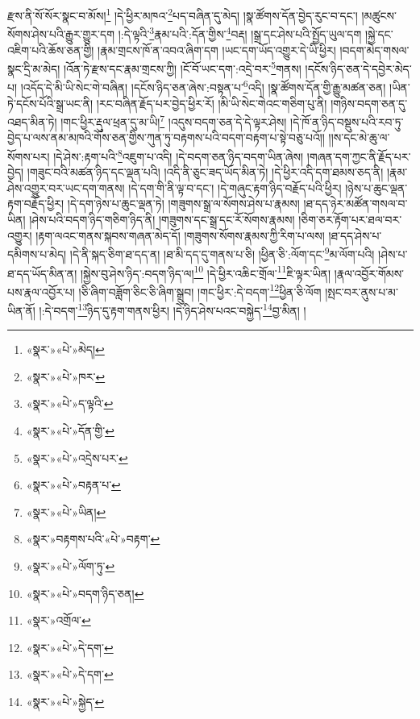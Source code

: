 རྫས་ནི་སོ་སོར་སྣང་བ་མོས།\footnote{«སྣར་»«པེ་»མེད།} །དེ་ཕྱིར་མཁའ་\footnote{«སྣར་»«པེ་»ཁར་}པད་བཞིན་དུ་མེད། །སྣ་ཚོགས་དོན་བྱེད་རུང་བ་དང་། །མཚུངས་སོགས་ཤེས་པའི་རྒྱུར་གྱུར་དག །:དེ་ལྟའི་\footnote{«སྣར་»«པེ་»ད་ལྟའི་}རྣམ་པའི་:དོན་གྱིས་\footnote{«སྣར་»«པེ་»དོན་གྱི་}བརྡ། །སྒྲ་དང་ཤེས་པའི་སྤྱོད་ཡུལ་དག །སྐྱེ་དང་འཇིག་པའི་ཆོས་ཅན་གྱི། །རྣམ་གྲངས་ཁོ་ན་འབའ་ཞིག་དག །ཡང་དག་ཡོད་འགྱུར་དེ་ཡི་ཕྱིར། །བདག་མེད་གསལ་སྣང་དྲི་མ་མེད། །འོན་ཏེ་རྫས་དང་རྣམ་གྲངས་ཀྱི། །ངོ་བོ་ཡང་དག་:འདྲེ་བར་\footnote{«སྣར་»«པེ་»འདྲེས་པར་}གནས། །དངོས་ཉིད་ཅན་དེ་དབྱེར་མེད་པ། །འདོད་དེ་མི་ཡི་སེང་གེ་བཞིན། །དངོས་ཉིད་ཅན་ཞེས་:བསྟན་པ་\footnote{«སྣར་»«པེ་»བརྟན་པ་}འདི། །སྣ་ཚོགས་དོན་གྱི་རྒྱུ་མཚན་ཅན། །ཡིན་ཏེ་དངོས་པོའི་སྒྲ་ཡང་ནི། །རང་བཞིན་རྗོད་པར་བྱེད་ཕྱིར་རོ། །མི་ཡི་སེང་གེའང་གཅིག་པུ་ནི། །གཉིས་བདག་ཅན་དུ་འཐད་མིན་ཏེ། །གང་ཕྱིར་རྡུལ་ཕྲན་དུ་མ་ཡི།\footnote{«སྣར་»«པེ་»ཡིན།} །འདུས་བདག་ཅན་དེ་དེ་ལྟར་ཤེས། །དེ་ཁོ་ན་ཉིད་བསྡུས་པའི་རབ་ཏུ་བྱེད་པ་ལས་ནམ་མཁའི་གོས་ཅན་གྱིས་ཀུན་ཏུ་བརྟགས་པའི་བདག་བརྟག་པ་སྟེ་བཅུ་པའོ།། །།ས་དང་མེ་ཆུ་ལ་སོགས་པར། །དེ་ཤེས་:རྟག་པའི་\footnote{«སྣར་»བརྟགས་པའི་«པེ་»བརྟག་}འཇུག་པ་འདི། །དེ་བདག་ཅན་ཉིད་བདག་ཡིན་ཞེས། །གཞན་དག་ཀྱང་ནི་རྗོད་པར་བྱེད། །གཟུང་བའི་མཚན་ཉིད་དང་ལྡན་པའི། །འདི་ནི་ཅུང་ཟད་ཡོད་མིན་ཏེ། །དེ་ཕྱིར་འདི་དག་ཐམས་ཅད་ནི། །རྣམ་ཤེས་འགྱུར་བར་ཡང་དག་གནས། །དེ་དག་གི་ནི་ལྟ་བ་དང་། །དེ་གཞུང་རྟག་ཉིད་བརྗོད་པའི་ཕྱིར། །ཉེས་པ་ཆུང་ལྡན་རྟག་བརྗོད་ཕྱིར། །དེ་དག་ཉེས་པ་ཆུང་ལྡན་ཏེ། །གཟུགས་སྒྲ་ལ་སོགས་ཤེས་པ་རྣམས། །ཐ་དད་ཉེར་མཚོན་གསལ་བ་ཡིན། །ཤེས་པའི་བདག་ཉིད་གཅིག་ཉིད་ནི། །གཟུགས་དང་སྒྲ་དང་རོ་སོགས་རྣམས། །ཅིག་ཅར་རྟོག་པར་ཐལ་བར་འགྱུར། །རྟག་ལའང་གནས་སྐབས་གཞན་མེད་དོ། །གཟུགས་སོགས་རྣམས་ཀྱི་རིག་པ་ལས། །ཐ་དད་ཤེས་པ་དམིགས་པ་མེད། །དེ་ནི་སྐད་ཅིག་ཐ་དད་ན། །ཐ་མི་དད་དུ་གནས་པ་ཅི། །ཕྱིན་ཅི་:ལོག་དང་\footnote{«སྣར་»«པེ་»ལོག་ཏུ་}མ་ལོག་པའི། །ཤེས་པ་ཐ་དད་ཡོད་མིན་ན། །སྐྱེས་བུ་ཤེས་ཉིད་:བདག་ཉིད་ལ།\footnote{«སྣར་»«པེ་»བདག་ཉིད་ཅན།} །དེ་ཕྱིར་འཆིང་གྲོལ་\footnote{«སྣར་»འགྲོལ་}ཇི་ལྟར་ཡིན། །རྣལ་འབྱོར་གོམས་པས་རྣལ་འབྱོར་པ། །ཅི་ཞིག་བཟློག་ཅིང་ཅི་ཞིག་སྒྲུབ། །གང་ཕྱིར་:དེ་བདག་\footnote{«སྣར་»«པེ་»དེ་དག་}ཕྱིན་ཅི་ལོག །སྤང་བར་ནུས་པ་མ་ཡིན་ནོ། །:དེ་བདག་\footnote{«སྣར་»«པེ་»དེ་དག་}ཉིད་དུ་རྟག་གནས་ཕྱིར། །དེ་ཉིད་ཤེས་པའང་བསྐྱེད་\footnote{«སྣར་»«པེ་»སྐྱེད་}བྱ་མིན། །

